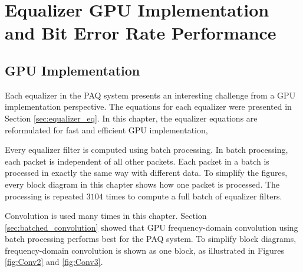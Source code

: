 \chapter{Equalizer GPU Implementation and Bit Error Rate Performance}
\label{chap:equalizers_in_gpus}
\section{GPU Implementation}
Each equalizer in the PAQ system presents an interesting challenge from a GPU implementation perspective.
The equations for each equalizer were presented in Section \ref{sec:equalizer_eq}.
In this chapter, the equalizer equations are reformulated for fast and efficient GPU implementation, 

Every equalizer filter is computed using batch processing.
In batch processing, each packet is independent of all other packets.
Each packet in a batch is processed in exactly the same way with different data.
To simplify the figures, every block diagram in this chapter shows how one packet is processed.
The processing is repeated $3104$ times to compute a full batch of equalizer filters.

Convolution is used many times in this chapter.
Section \ref{sec:batched_convolution} showed that GPU frequency-domain convolution using batch processing performs best for the PAQ system.
To simplify block diagrams, frequency-domain convolution is shown as one block, as illustrated in
Figures \ref{fig:Conv2} and \ref{fig:Conv3}.

